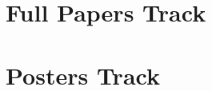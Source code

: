 \documentclass[openany, parskip=full, 12pt, a4]{scrbook}
\begin{document}
\chapter{Full Papers Track}



% 
% 
% 
% 
% 
% 
% 
% 
% 
% 
% 
% 
% 
% 
% 
% 

\chapter{Posters Track}

% 
% 
% 

% 
% 
% 
% 
% 
% 
% 
% 
% 



\end{document}
